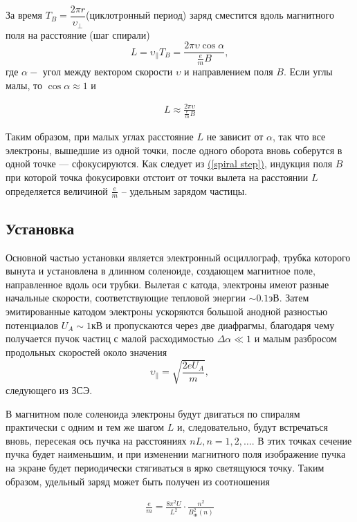 \documentclass[a4paper]{article}
\begin{document}
За время $T_B = \dfrac{2\pi r}{\upsilon_\perp}$(циклотронный период) заряд сместится вдоль магнитного поля на расстояние (шаг спирали)
\[L = \upsilon_\parallel T_B = \dfrac{2\pi \upsilon \cos{\alpha}}{\frac{e}{m}B},\]
где $\alpha - $ угол между вектором скорости $\upsilon$ и направлением поля $B$. Если углы малы, то $\cos{\alpha}\approx 1$ и 

\begin{align}\label{spiral step}
	L \approx \frac{2\pi\upsilon}{\frac{e}{m} B}
\end{align}

Таким образом, при малых углах расстояние $L$ не зависит от $\alpha$, так что все электроны, вышедшие из одной точки, после одного оборота вновь соберутся в одной точке — сфокусируются. Как следует из \hyperref[spiral step]{(\ref{spiral step})}, индукция поля $B$ при которой точка фокусировки отстоит от точки вылета на расстоянии $L$ определяется величиной $\frac{e}{m}$ -- удельным зарядом частицы.

\subsection*{Установка}
Основной частью установки является электронный осциллограф, трубка которого вынута и установлена в длинном соленоиде, создающем магнитное поле, направленное вдоль оси трубки. Вылетая с катода, элек­троны имеют разные начальные скорости, соответствующие тепловой энергии $\sim 0.1$эВ. Затем эмитированные катодом электроны ускоряются большой анодной разностью потенциалов $U_A \sim 1$кВ и пропускаются через две диафрагмы, благодаря чему получается пучок частиц с малой расходимостью $\Delta\alpha \ll 1$ и малым разбросом продольных скоростей около значения
\[\upsilon_\parallel=\sqrt{\frac{2eU_A}{m}},\]следующего из ЗСЭ.

В магнитном поле соленоида %
электроны будут двигаться по спиралям практически с одним и тем же шагом $L$ и, следовательно, будут встречаться вновь, пересекая ось пучка на расстояниях $nL, n = 1, 2, \ldots$. В этих точках сечение пучка будет наименьшим, и при изменении магнитного поля изображение пучка на экране будет периодически стягиваться в ярко светящуюся точку. Таким образом, удельный заряд может быть получен из соотношения

\begin{align}\label{RelativeMass}
\frac{e}{m} = \frac{8\pi^2U}{L^2}\cdot\frac{n^2}{B^2_{\text{Ф}}(n)}
\end{align}
\end{document}
